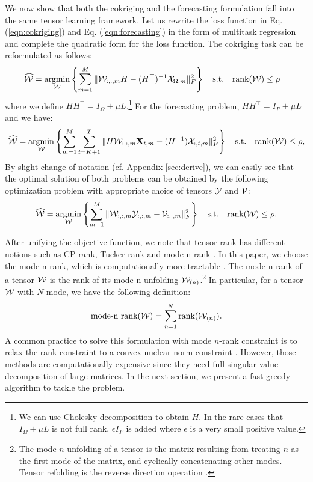 We now show that both the cokriging and the forecasting formulation fall into the same tensor learning framework. Let us rewrite the loss function in Eq. (\ref{eqn:cokriging}) and Eq. (\ref{eqn:forecasting}) in the form of multitask regression and complete the quadratic form for the loss function. The cokriging task can be reformulated as follows:
\begin{align}
\widehat{{\mathcal W}} = \operatorname*{argmin}_{{\mathcal W}}& \left\{\sum_{m=1}^{M} \|{\mathcal W}_{:, :, m}H - (H^{\top})^{-1}{\mathcal X}_{\Omega, m} \|^2_F\right\} \quad
\mathrm{s.t.} \quad \text{rank}({\mathcal W}) \leq \rho  \label{eqn:cokriging_reformulate}
\end{align}
\noindent where we define $HH^{\top} = I_{\Omega}+\mu L$.\footnote{We can use Cholesky decomposition to obtain $H$. In the rare cases that $I_{\Omega}+\mu L$ is not full rank, $\epsilon I_{P}$ is added where $\epsilon$ is a very small positive value.} For the forecasting problem, $HH^{\top} = I_{P}+\mu L$ and we have:
\begin{align}
\widehat{{\mathcal W}} = \operatorname*{argmin}_{{\mathcal W}} \left\{\sum_{m=1}^{M}\sum_{t=K+1}^{T} \|H{\mathcal W}_{:, :, m}\mathbf{X}_{t, m} - (H^{-1}){\mathcal X}_{:, t, m} \|^2_F\right\}
\quad \mathrm{s.t.}  \quad\text{rank}({\mathcal W}) \leq \rho,  \label{eqn:forecasting_reformulate}
\end{align}
By slight change of notation (cf. Appendix \ref{sec:derive}), we can easily see that the optimal solution of both problems can be obtained by the following optimization problem with appropriate choice of tensors ${\mathcal Y}$ and ${\mathcal V}$:
\begin{equation}
\widehat{{\mathcal W}} = \operatorname*{argmin}_{{\mathcal W}} \left\{\sum_{m=1}^{M} \|{\mathcal W}_{:, :, m}{\mathcal Y}_{:, :, m} - {\mathcal V}_{:, :, m} \|^2_F\right\} \quad
\mathrm{s.t.} \quad\text{rank}({\mathcal W}) \leq \rho.
\label{eq:greedyUnified}
\end{equation}

After unifying the objective function, we note that tensor rank has different notions such as CP rank, Tucker rank and mode n-rank \cite{kolda2009tensor,gandy2011tensor}. In this paper,  we choose the mode-n rank, which is computationally more tractable \cite{gandy2011tensor,tomioka2010estimation}. The mode-n rank of a tensor ${\mathcal W}$ is the rank of its mode-n unfolding ${\mathcal W}_{(n)}$.\footnote{The mode-$n$ unfolding of a tensor is the matrix resulting from treating $n$ as the first mode of the matrix, and cyclically concatenating other modes. Tensor refolding is the reverse direction operation \cite{kolda2009tensor}.} In particular, for a tensor ${\mathcal W}$ with $N$ mode, we have the following definition:
\begin{equation}
\text{mode-n rank}({\mathcal W}) = \sum\limits_{n=1}^N \text{rank}({\mathcal W}_{(n)}).
\end{equation}
 A common practice to solve this formulation with mode $n$-rank constraint  is to relax the rank constraint to a convex nuclear norm constraint \cite{gandy2011tensor,tomioka2010estimation}. However, those methods are  computationally expensive since they need full singular value decomposition of large matrices. In the next section, we present a fast greedy algorithm to tackle the problem.
